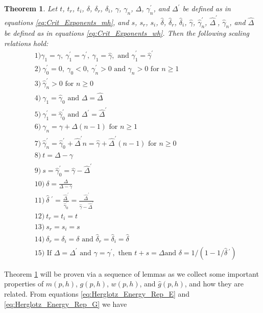 \documentclass[english,12pt,jmp,graphicx]{revtex4-1}
\newtheorem{theorem}{Theorem}[section]
\newcommand{\gh}{\hat{\gamma}}
\newcommand{\Dh}{\hat{\Delta}}
\newcommand{\dha}{\hat{\delta}}
\begin{document}
\begin{theorem} \label{thm:Crit_Theory_m_w}
  Let $t$, $t_r$, $t_i$, $\delta$, $\delta_r$, $\delta_i$, $\gamma$, $\gamma_n$, $\Delta$, $\gamma_n^\prime$,
  and $\Delta^\prime$ be   defined as in equations \eqref{eq:Crit_Exponents_mh},
  and $s$, $s_r$, $s_i$, $\dha$, $\dha_r$, $\dha_i$, $\gh$, $\gh_n^\prime$,
  $\Dh^\prime$, $\gh_n$, and $\Dh$ be defined as in equations
  \eqref{eq:Crit_Exponents_wh}. Then the following scaling relations
  hold:
%  
  \begin{align*}   
   &1) \gamma_1=\gamma, \ \gamma_1^\prime=\gamma^\prime, \ \gh_1=\gh, \text{ and } \gh_1^\prime=\gh^\prime\\
   &2) \ \gamma_0^\prime=0, \ \gamma_0<0, \ \gamma_n^\prime>0 \text{ and } \gamma_n>0 \text{ for } n\geq1\\
   &3) \ \gh_n^\prime>0 \text{ for } n\geq0\\
   &4) \ \gamma_1=\gh_0 \text{ and } \Delta=\Dh\\
   &5) \ \gamma_1^\prime=\gh_0^\prime \text{ and } \Delta^\prime=\Dh^\prime \\
   &6) \ \gamma_n=\gamma+\Delta(n-1) \text{ for } n\geq1 \\
   &7) \ \gh_n^\prime=\gh_0^\prime+\Dh^\prime n=\gh+\Dh^\prime(n-1) \text{ for } n\geq0 \\
   &8) \ t=\Delta-\gamma \\
   &9) \ s=\gh_0^\prime=\gh-\Dh^\prime \\
   &10) \ \delta=\frac{\Delta}{\Delta-\gamma} \\
   &11) \ \dha\;^\prime=\frac{\Dh^\prime}{\gh_0^\prime}=\frac{\Dh^\prime}{\gh-\Dh^\prime} \\
   &12) \ t_r=t_i=t \\
   &13) \ s_r=s_i=s \\
   &14) \ \delta_r=\delta_i=\delta \text{ and } \dha_r=\dha_i=\dha \\
   &15) \text{ If } \Delta=\Delta^\prime \text{ and } \gamma=\gamma^\prime, \text{ then } t+s=\Delta \text{
     and }  \delta=1/(1-1/\dha\,^\prime)
  \end{align*}
%  
\end{theorem}
%

Theorem \ref{thm:Crit_Theory_m_w} will be proven via a sequence of
lemmas as we collect some important properties of $m(p,h)$, $g(p,h)$,
$w(p,h)$, and $\hat{g}(p,h)$, and how they are related. From equations
\eqref{eq:Herglotz_Energy_Rep_E} and \eqref{eq:Herglotz_Energy_Rep_G}
we have   
\end{document}
